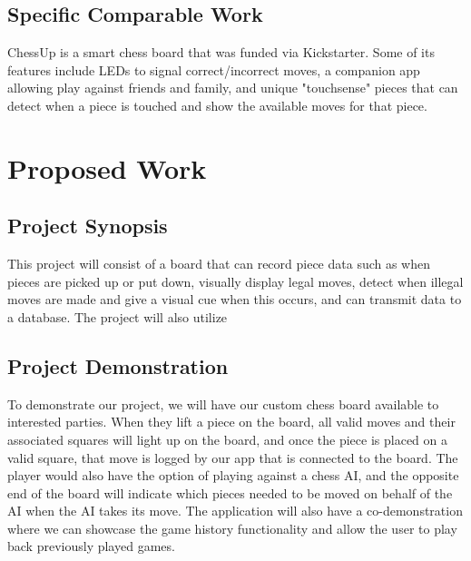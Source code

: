 \documentclass[11pt,journal]{IEEEtran}
\begin{document}
\subsection{Specific Comparable Work}
ChessUp is a smart chess board that was funded via Kickstarter. Some of its features include LEDs to signal correct/incorrect moves, a companion app allowing play against friends and family, and unique "touchsense" pieces that can detect when a piece is touched and show the available moves for that piece.\cite{chessup} 




\section{Proposed Work}


\subsection{Project Synopsis}
This project will consist of a board that can record piece data such as when pieces are picked up or put down, visually display legal moves, detect when illegal moves are made and give a visual cue when this occurs, and can transmit data to a database. The project will also utilize 

\subsection{Project Demonstration}
To demonstrate our project, we will have our custom chess board available to interested parties. When they lift a piece on the board, all valid moves and their associated squares will light up on the board, and once the piece is placed on a valid square, that move is logged by our app that is connected to the board. The player would also have the option of playing against a chess AI, and the opposite end of the board will indicate which pieces needed to be moved on behalf of the AI when the AI takes its move. The application will also have a co-demonstration where we can showcase the game history functionality and allow the user to play back previously played games.
\end{document}
